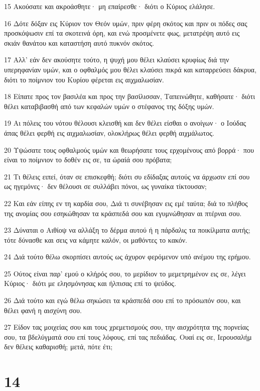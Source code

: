 \par 15 Ακούσατε και ακροάσθητε· μη επαίρεσθε· διότι ο Κύριος ελάλησε.
\par 16 Δότε δόξαν εις Κύριον τον Θεόν υμών, πριν φέρη σκότος και πριν οι πόδες σας προσκόψωσιν επί τα σκοτεινά όρη, και ενώ προσμένετε φως, μετατρέψη αυτό εις σκιάν θανάτου και καταστήση αυτό πυκνόν σκότος.
\par 17 Αλλ' εάν δεν ακούσητε τούτο, η ψυχή μου θέλει κλαύσει κρυφίως διά την υπερηφανίαν υμών, και ο οφθαλμός μου θέλει κλαύσει πικρά και καταρρεύσει δάκρυα, διότι το ποίμνιον του Κυρίου φέρεται εις αιχμαλωσίαν.
\par 18 Είπατε προς τον βασιλέα και προς την βασίλισσαν, Ταπεινώθητε, καθήσατε· διότι θέλει καταβιβασθή από των κεφαλών υμών ο στέφανος της δόξης υμών.
\par 19 Αι πόλεις του νότου θέλουσι κλεισθή και δεν θέλει είσθαι ο ανοίγων· ο Ιούδας άπας θέλει φερθή εις αιχμαλωσίαν, ολοκλήρως θέλει φερθή αιχμάλωτος.
\par 20 Υψώσατε τους οφθαλμούς υμών και θεωρήσατε τους ερχομένους από βορρά· που είναι το ποίμνιον το δοθέν εις σε, τα ώραίά σου πρόβατα;
\par 21 Τι θέλεις ειπεί, όταν σε επισκεφθή; διότι συ εδίδαξας αυτούς να άρχωσιν επί σου ως ηγεμόνες· δεν θέλουσι σε συλλάβει πόνοι, ως γυναίκα τίκτουσαν;
\par 22 Και εάν είπης εν τη καρδία σου, Διά τι συνέβησαν εις εμέ ταύτα; διά το πλήθος της ανομίας σου εσηκώθησαν τα κράσπεδά σου και εγυμνώθησαν αι πτέρναι σου.
\par 23 Δύναται ο Αιθίοψ να αλλάξη το δέρμα αυτού ή η πάρδαλις τα ποικίλματα αυτής; τότε δύνασθε και σεις να κάμητε καλόν, οι μαθόντες το κακόν.
\par 24 Διά τούτο θέλω σκορπίσει αυτούς ως άχυρον φερόμενον υπό ανέμου της ερήμου.
\par 25 Ούτος είναι παρ' εμού ο κλήρός σου, το μερίδιον το μεμετρημένον εις σε, λέγει Κύριος· διότι με ελησμόνησας και ήλπισας επί το ψεύδος.
\par 26 Διά τούτο και εγώ θέλω σηκώσει τα κράσπεδά σου επί το πρόσωπόν σου, και θέλει φανή η αισχύνη σου.
\par 27 Είδον τας μοιχείας σου και τους χρεμετισμούς σου, την αισχρότητα της πορνείας σου, τα βδελύγματά σου επί τους λόφους, επί τας πεδιάδας. Ουαί εις σε, Ιερουσαλήμ δεν θέλεις καθαρισθή; μετά, πότε έτι;

\chapter{14}

